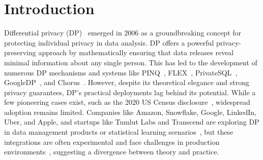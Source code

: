 \section{Introduction}

Differential privacy (DP)~\cite{dwork2006calibrating} emerged in 2006 as a groundbreaking concept for protecting individual privacy in data analysis. DP offers a powerful privacy-preserving approach by mathematically ensuring that data releases reveal minimal information about any single person. This has led to the development of numerous DP mechanisms and systems like PINQ~\cite{mcsherry2009pinq}, FLEX~\cite{johnson2018towards}, PrivateSQL~\cite{kotsogiannis2019privatesql}, GoogleDP~\cite{amin2022plume}, and Chorus~\cite{johnson2020chorus}.
However, despite its theoretical elegance and strong privacy guarantees, DP's practical deployments lag behind its potential. While a few pioneering cases exist, such as the 2020 US Census disclosure~\cite{abowd2018census,hawes2020census}, widespread adoption remains limited. Companies like Amazon, Snowflake, Google, LinkedIn, Uber, and Apple, and startups like Tumlut Labs and Transcend are exploring DP in data management products or statistical learning scenarios~\cite{amazon_DP,snowflake_DP,google_DP_big_query,wilson2020differentially,houssiau2022google_map,rogers2020linkedin,DingKY17microsoft_DP, openDP,tumult, transcend}, but these integrations are often experimental and face challenges in production environments~\cite{tang2017privacy,GadottiHAM22apple_DP_attack,yu2022thwarting}, suggesting a divergence between theory and practice.


